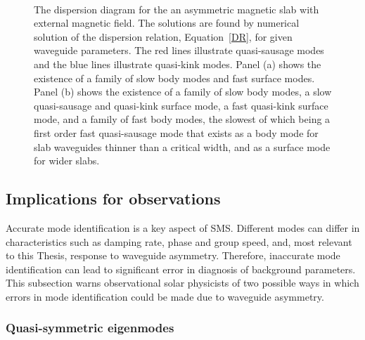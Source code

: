\begin{figure}[]
	\centering
	 \\
	\caption{The dispersion diagram for the an asymmetric magnetic slab with external magnetic field. The solutions are found by numerical solution of the dispersion relation, Equation~\eqref{DR}, for given waveguide parameters. The red lines illustrate quasi-sausage modes and the blue lines illustrate quasi-kink modes. Panel (a) shows the existence of a family of slow body modes and fast surface modes. Panel (b) shows the existence of a family of slow body modes, a slow quasi-sausage and quasi-kink surface mode, a fast quasi-kink surface mode, and a family of fast body modes, the slowest of which being a first order fast quasi-sausage mode that exists as a body mode for slab waveguides thinner than a critical width, and as a surface mode for wider slabs.}
	\label{fig: disp mag}
\end{figure}


\subsection{Implications for observations}

Accurate mode identification is a key aspect of SMS. Different modes can differ in characteristics such as damping rate, phase and group speed, and, most relevant to this Thesis, response to waveguide asymmetry. Therefore, inaccurate mode identification can lead to significant error in diagnosis of background parameters. This subsection warns observational solar physicists of two possible ways in which errors in mode identification  could be made due to waveguide asymmetry.


\subsubsection{Quasi-symmetric eigenmodes}

